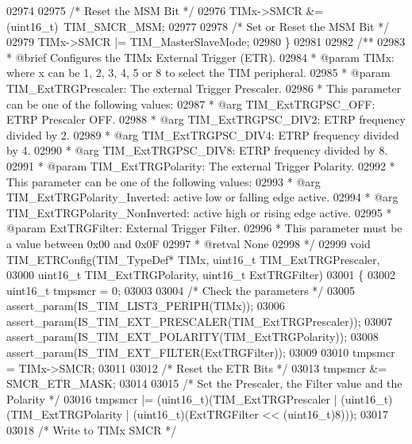 \begin{DoxyCode}
02974 
02975   \textcolor{comment}{/* Reset the MSM Bit */}
02976   TIMx->SMCR &= (uint16\_t)~TIM_SMCR_MSM;
02977 
02978   \textcolor{comment}{/* Set or Reset the MSM Bit */}
02979   TIMx->SMCR |= TIM\_MasterSlaveMode;
02980 \}
02981 
02982 \textcolor{comment}{/**}
02983 \textcolor{comment}{  * @brief  Configures the TIMx External Trigger (ETR).}
02984 \textcolor{comment}{  * @param  TIMx: where x can be  1, 2, 3, 4, 5 or 8 to select the TIM peripheral.}
02985 \textcolor{comment}{  * @param  TIM\_ExtTRGPrescaler: The external Trigger Prescaler.}
02986 \textcolor{comment}{  *          This parameter can be one of the following values:}
02987 \textcolor{comment}{  *            @arg TIM\_ExtTRGPSC\_OFF: ETRP Prescaler OFF.}
02988 \textcolor{comment}{  *            @arg TIM\_ExtTRGPSC\_DIV2: ETRP frequency divided by 2.}
02989 \textcolor{comment}{  *            @arg TIM\_ExtTRGPSC\_DIV4: ETRP frequency divided by 4.}
02990 \textcolor{comment}{  *            @arg TIM\_ExtTRGPSC\_DIV8: ETRP frequency divided by 8.}
02991 \textcolor{comment}{  * @param  TIM\_ExtTRGPolarity: The external Trigger Polarity.}
02992 \textcolor{comment}{  *          This parameter can be one of the following values:}
02993 \textcolor{comment}{  *            @arg TIM\_ExtTRGPolarity\_Inverted: active low or falling edge active.}
02994 \textcolor{comment}{  *            @arg TIM\_ExtTRGPolarity\_NonInverted: active high or rising edge active.}
02995 \textcolor{comment}{  * @param  ExtTRGFilter: External Trigger Filter.}
02996 \textcolor{comment}{  *          This parameter must be a value between 0x00 and 0x0F}
02997 \textcolor{comment}{  * @retval None}
02998 \textcolor{comment}{  */}
02999 \textcolor{keywordtype}{void} TIM_ETRConfig(TIM\_TypeDef* TIMx, uint16\_t TIM\_ExtTRGPrescaler,
03000                    uint16\_t TIM\_ExtTRGPolarity, uint16\_t ExtTRGFilter)
03001 \{
03002   uint16\_t tmpsmcr = 0;
03003 
03004   \textcolor{comment}{/* Check the parameters */}
03005   assert_param(IS\_TIM\_LIST3\_PERIPH(TIMx));
03006   assert_param(IS\_TIM\_EXT\_PRESCALER(TIM\_ExtTRGPrescaler));
03007   assert_param(IS\_TIM\_EXT\_POLARITY(TIM\_ExtTRGPolarity));
03008   assert_param(IS\_TIM\_EXT\_FILTER(ExtTRGFilter));
03009 
03010   tmpsmcr = TIMx->SMCR;
03011 
03012   \textcolor{comment}{/* Reset the ETR Bits */}
03013   tmpsmcr &= SMCR_ETR_MASK;
03014 
03015   \textcolor{comment}{/* Set the Prescaler, the Filter value and the Polarity */}
03016   tmpsmcr |= (uint16\_t)(TIM\_ExtTRGPrescaler | (uint16\_t)(TIM\_ExtTRGPolarity | (uint16\_t)(ExtTRGFilter 
      << (uint16\_t)8)));
03017 
03018   \textcolor{comment}{/* Write to TIMx SMCR */}

\end{DoxyCode}
